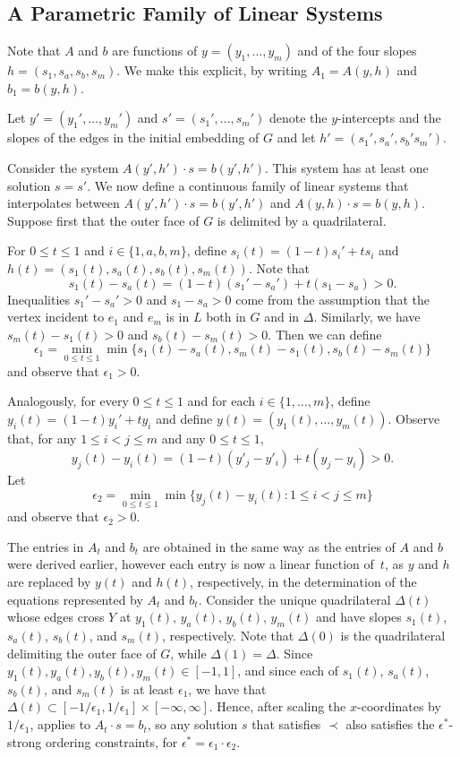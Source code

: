 \subsection{A Parametric Family of Linear Systems}

Note that $A$ and $b$ are functions of $y=(y_1,\ldots,y_m)$ and of the
four slopes $h=(s_1,s_a,s_b,s_m)$. We make this explicit, by writing
$A_1=A(y,h)$ and $b_1=b(y,h)$.

Let $y'=(y_1',\ldots,y_m')$ and $s'=(s_1',\ldots,s_m')$ denote the
$y$-intercepts and the slopes of the edges in the initial embedding of $G$
and let $h'=(s_1',s_a',s_b's_m')$. 

Consider the system $A(y',h')\cdot s = b(y',h')$.  This system has
at least one solution $s=s'$.  We now define
a continuous family of linear systems that interpolates between $A(y',h')\cdot s=b(y',h')$ and $A(y,h)\cdot s=b(y,h)$. Suppose first that the outer face of $G$ is delimited by a quadrilateral.

For $0\le t\le 1$ and $i\in\{1,a,b,m\}$,  define $s_i(t)=(1-t)s_i' + ts_i$ and $h(t)=(s_1(t),s_a(t),s_b(t),s_m(t))$.
Note that
\[  
s_1(t)-s_a(t) = (1-t)(s_1'-s_a') + t(s_1-s_a) > 0. 
\]
Inequalities $s_1'-s_a'>0$ and $s_1-s_a>0$ come from the assumption that the vertex incident to  $e_1$ and $e_m$ is in $L$ both in $G$ and in $\Delta$. Similarly, we have $s_m(t)-s_1(t)>0$ and $s_b(t)-s_m(t)>0$. Then we can define \[
\epsilon_1 = \min_{0\le t\le 1}\min\{s_1(t)-s_a(t), s_m(t)-s_1(t), s_b(t)-s_m(t)\}
\]
and observe that $\epsilon_1>0$.

Analogously, for every $0\le t\le 1$ and for each $i\in\{1,\ldots,m\}$, define $y_i(t) = (1-t)y_i' + ty_i$ and define $y(t)=(y_1(t),\ldots,y_m(t))$.
Observe that, for any
$1\le i< j\le m$ and any $0\le t\le 1$,
\[
y_j(t) - y_i(t) = (1-t)(y'_j-y'_i) + t(y_j-y_i) > 0.
\]
Let 
\[    \epsilon_2=\min_{0\le t\le 1}\min\{y_j(t)-y_i(t): 1\le i< j\le m\}
\]
and observe that $\epsilon_2 >0$.  

The entries in $A_t$ and $b_t$ are obtained in the same way as the entries of $A$ and $b$ were derived earlier, however each entry is now a linear function of~$t$, as $y$ and $h$ are replaced by $y(t)$ and $h(t)$, respectively, in the determination of the equations represented by $A_t$ and $b_t$.
Consider the unique quadrilateral $\Delta(t)$ whose edges cross $Y$ at
$y_1(t)$, $y_a(t)$, $y_b(t)$, $y_m(t)$ and have slopes $s_1(t)$,
$s_a(t)$, $s_b(t)$, and $s_m(t)$, respectively. Note that $\Delta(0)$ is the quadrilateral delimiting the outer face of $G$, while $\Delta(1)=\Delta$. Since $y_1(t),y_a(t),y_b(t),y_m(t)\in [-1,1]$, and since each of $s_1(t)$,
$s_a(t)$, $s_b(t)$, and $s_m(t)$ is at least $\epsilon_1$, we have that $\Delta(t)\subset[-1/\epsilon_1,1/\epsilon_1]\times[-\infty,\infty]$.
Hence, after scaling the $x$-coordinates by $1/\epsilon_1$,
 applies to $A_t\cdot s =b_t$, so any solution $s$
that satisfies $\prec$ also satisfies the $\epsilon^*$-strong ordering
constraints, for $\epsilon^*=\epsilon_1\cdot\epsilon_2$.

